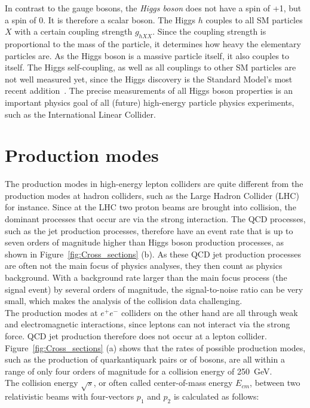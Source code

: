 In contrast to the gauge bosons, the \textit{Higgs boson} does not have a spin of +1, but a spin of 0.
It is therefore a scalar boson.
The Higgs $h$ couples to all SM particles $X$ with a certain coupling strength $g_{hXX}$.
Since the coupling strength is proportional to the mass of the particle, it determines how heavy the elementary particles are.
As the Higgs boson is a massive particle itself, it also couples to itself.
The Higgs self-coupling, as well as all couplings to other SM particles are not well measured yet, since the Higgs discovery is the Standard Model's most recent addition~\cite{Higgs,Higgs2}.
The precise measurements of all Higgs boson properties is an important physics goal of all (future) high-energy particle physics experiments, such as the International Linear Collider. 

\section{Production modes}
\label{Production_modes}
The production modes in high-energy lepton colliders are quite different from the production modes at hadron colliders, such as the Large Hadron Collider (LHC) for instance.
Since at the LHC two proton beams are brought into collision, the dominant processes that occur are via the strong interaction.
The QCD processes, such as the jet production processes, therefore have an event rate that is up to seven orders of magnitude higher than Higgs boson production processes, as shown in Figure~\ref{fig:Cross_sections} (b).
As these QCD jet production processes are often not the main focus of physics analyses, they then count as physics background.
With a background rate larger than the main focus process (the signal event) by several orders of magnitude, the signal-to-noise ratio can be very small, which makes the analysis of the collision data challenging.
\\The production modes at $e^+e^-$ colliders on the other hand are all through weak and electromagnetic interactions, since leptons can not interact via the strong force.
QCD jet production therefore does not occur at a lepton collider.
Figure~\ref{fig:Cross_sections} (a) shows that the rates of possible production modes, such as the production of quark\textendash antiquark pairs or of bosons, are all within a range of only four orders of magnitude for a collision energy of \SI{250}{\GeV}.
\\The collision energy $\sqrt{s}$, or often called center-of-mass energy $E_{cm}$, between two relativistic beams with four-vectors $p_1$ and $p_2$ is calculated as follows:
